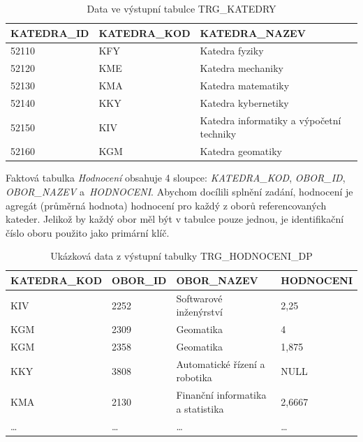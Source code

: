\begin{table}[htb]
    \centering

    \begin{tabular}{lll}
        \toprule

        KATEDRA\_ID & KATEDRA\_KOD  & KATEDRA\_NAZEV                            \\ \midrule
        52110       & KFY           & Katedra fyziky                            \\
        52120       & KME           & Katedra mechaniky                         \\
        52130       & KMA           & Katedra matematiky                        \\
        52140       & KKY           & Katedra kybernetiky                       \\
        52150       & KIV           & Katedra informatiky a výpočetní techniky  \\
        52160       & KGM           & Katedra geomatiky                         \\
          
        \bottomrule
    \end{tabular}

    \caption{Data ve výstupní tabulce TRG\_KATEDRY}
    \label{table:table1}
\end{table}
\FloatBarrier

Faktová tabulka \textit{Hodnocení} obsahuje 4 sloupce: \textit{KATEDRA\_KOD}, \textit{OBOR\_ID}, \textit{OBOR\_NAZEV} a~\textit{HODNOCENI}.
Abychom docílili splnění zadání, hodnocení je agregát (průměrná hodnota) hodnocení pro každý z oborů referencovaných kateder.
Jelikož by každý obor měl být v tabulce pouze jednou, je identifikační číslo oboru použito jako primární klíč.

\begin{table}[htb]
    \centering

    \begin{tabular}{llll}
        \toprule

        KATEDRA\_KOD    & OBOR\_ID  & OBOR\_NAZEV                       & HODNOCENI \\ \midrule
        KIV             & 2252      & Softwarové inženýrství            & 2,25      \\
        KGM             & 2309      & Geomatika                         & 4         \\
        KGM             & 2358      & Geomatika                         & 1,875     \\
        KKY             & 3808      & Automatické řízení a robotika     & NULL      \\
        KMA             & 2130      & Finanční informatika a statistika & 2,6667    \\
        \ldots          & \ldots    & \ldots                            & \ldots    \\

        \bottomrule
    \end{tabular}

    \caption{Ukázková data z výstupní tabulky TRG\_HODNOCENI\_DP}
    \label{table:table2}
\end{table}
\FloatBarrier

